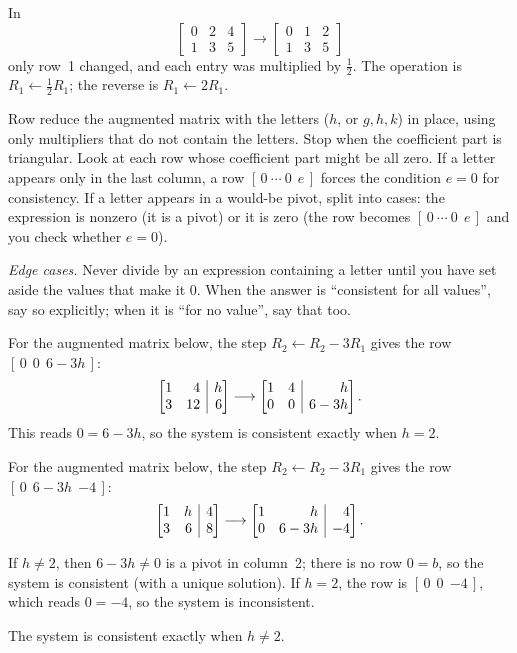 \documentclass[10pt]{scrartcl}
\makeatletter
\newcommand{\aug}[2]{\left[\begin{array}{@{}#1@{}}#2\end{array}\right]}
\makeatother
\begin{document}
\begin{example*}
In
\[
  \begin{bmatrix}0&2&4\\1&3&5\end{bmatrix}\longrightarrow\begin{bmatrix}0&1&2\\1&3&5\end{bmatrix}
\]
only row~1 changed, and each entry was multiplied by $\tfrac12$. The operation is $R_1\leftarrow\tfrac12R_1$; the reverse is $R_1\leftarrow 2R_1$.
\end{example*}

\begin{steps}
  \ii Row reduce the augmented matrix with the letters ($h$, or $g,h,k$) in place, using only multipliers that do not contain the letters.
  \ii Stop when the coefficient part is triangular. Look at each row whose coefficient part might be all zero.
  \ii If a letter appears only in the last column, a row $[\,0\ \cdots\ 0\ \ e\,]$ forces the condition $e=0$ for consistency.
  \ii If a letter appears in a would-be pivot, split into cases: the expression is nonzero (it is a pivot) or it is zero (the row becomes $[\,0\ \cdots\ 0\ \ e\,]$ and you check whether $e=0$).
\end{steps}
\emph{Edge cases.} Never divide by an expression containing a letter until you have set aside the values that make it $0$. When the answer is ``consistent for all values'', say so explicitly; when it is ``for no value'', say that too.

\begin{example*}
For the augmented matrix below, the step $R_2\leftarrow R_2-3R_1$ gives the row $[\,0\ \ 0\ \ 6-3h\,]$:
\[
  \aug{rr|r}{1&4&h\\3&12&6}\longrightarrow\aug{rr|r}{1&4&h\\0&0&6-3h}.
\] This reads $0=6-3h$, so the system is consistent exactly when $h=2$.
\end{example*}

\begin{example*}
For the augmented matrix below, the step $R_2\leftarrow R_2-3R_1$ gives the row $[\,0\ \ 6-3h\ \ {-4}\,]$:
\[
  \aug{rr|r}{1&h&4\\3&6&8}\longrightarrow\aug{rr|r}{1&h&4\\0&6-3h&-4}.
\]
\begin{itemize}
  \ii If $h\ne2$, then $6-3h\ne0$ is a pivot in column~2; there is no row $0=b$, so the system is consistent (with a unique solution).
  \ii If $h=2$, the row is $[\,0\ \ 0\ \ {-4}\,]$, which reads $0=-4$, so the system is inconsistent.
\end{itemize}
The system is consistent exactly when $h\ne2$.
\end{example*}
\end{document}

